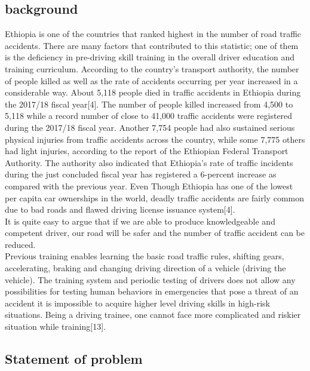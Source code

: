 \documentclass[12pt,a4paper]{article}
\begin{document}
\subsection{background}
Ethiopia is one of the countries that ranked highest in the number of road traffic accidents. There are many factors that contributed to this statistic; one of them is the deficiency in pre-driving skill training in the overall driver education and training curriculum.  According to the country’s transport authority, the number of people killed as well as the rate of accidents occurring per year increased in a considerable way. About 5,118 people died in traffic accidents in Ethiopia during the 2017/18 fiscal year[4]. The number of people killed increased from 4,500 to 5,118 while a record number of close to 41,000 traffic accidents were registered during the 2017/18 fiscal year. Another 7,754 people had also sustained serious physical injuries from traffic accidents across the country, while some 7,775 others had light injuries, according to the report of the Ethiopian Federal Transport Authority. The authority also indicated that Ethiopia’s rate of traffic incidents during the just concluded fiscal year has registered a 6-percent increase as compared with the previous year. Even Though Ethiopia has one of the lowest per capita car ownerships in the world, deadly traffic accidents are fairly common due to bad roads and flawed driving license issuance system[4].\\

It is quite easy to argue that if we are able to produce knowledgeable and competent driver, our road will be safer and the number of traffic accident can be reduced.\\

Previous training enables learning the basic road traffic rules, shifting gears, accelerating, braking and changing driving direction of a vehicle (driving the vehicle). The training system and periodic testing of drivers does not allow any possibilities for testing human behaviors in emergencies that pose a threat of an accident it is impossible to acquire higher level driving skills in high-risk situations. Being a driving trainee, one cannot face more complicated and riskier situation while training[13].
\subsection{Statement of problem}
\end{document}
